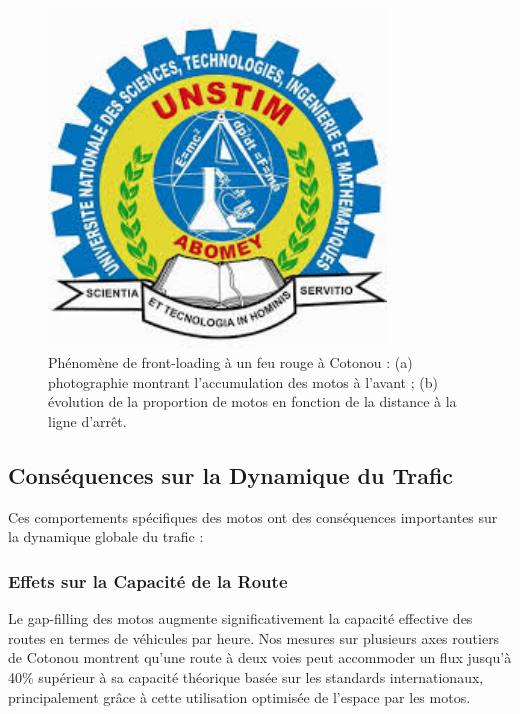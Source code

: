 \begin{figure}[htbp]
\centering
\includegraphics[width=0.8\textwidth]{images/specificites_benin/placeholder}
\caption{Phénomène de front-loading à un feu rouge à Cotonou : (a) photographie montrant l'accumulation des motos à l'avant ; (b) évolution de la proportion de motos en fonction de la distance à la ligne d'arrêt.}
\label{fig:front_loading}
\end{figure}

\subsection{Conséquences sur la Dynamique du Trafic}
\label{subsec:consequences_dynamique}

Ces comportements spécifiques des motos ont des conséquences importantes sur la dynamique globale du trafic :

\subsubsection{Effets sur la Capacité de la Route}
\label{subsubsec:effets_capacite}

Le gap-filling des motos augmente significativement la capacité effective des routes en termes de véhicules par heure. Nos mesures sur plusieurs axes routiers de Cotonou montrent qu'une route à deux voies peut accommoder un flux jusqu'à 40\% supérieur à sa capacité théorique basée sur les standards internationaux, principalement grâce à cette utilisation optimisée de l'espace par les motos.

